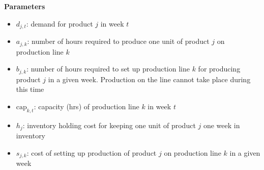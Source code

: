 \documentclass[10pt]{article}
\begin{document}
\textbf{Parameters}
\begin{itemize}
    \item $d_{j, t} $: demand for product $j $ in week $t $
    \item $a_{j, k} $: number of hours required to produce one unit of product $ j $ on production line $k $
    \item $b_{j, k} $: number of hours required to set up production line $k $ for producing product $j $ in a given week. Production on the line cannot take place during this time 
    \item $\text{cap}_{k, t} $: capacity (hrs) of production line $k $ in week $t $
    \item $h_j $: inventory holding cost for keeping one unit of product $j $ one week in inventory 
    \item $s_{j, k} $: cost of setting up production of product $j $ on production line $k $ in a given week 
\end{itemize}
\end{document}

